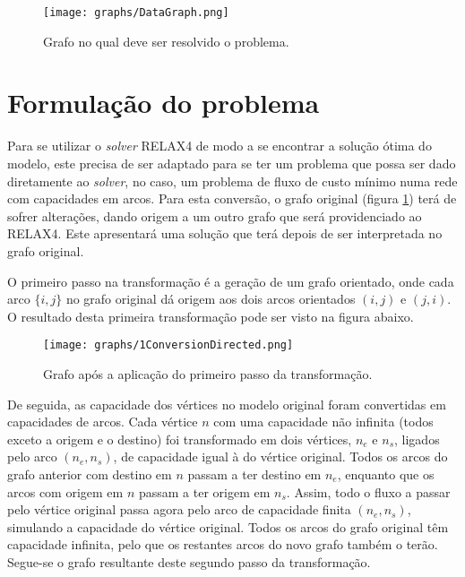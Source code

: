 \documentclass[12pt, a4paper, titlepage]{article}
\begin{document}
\begin{figure}[H]
    \centering
    \texttt{[image: graphs/DataGraph.png]}
    \caption{Grafo no qual deve ser resolvido o problema.}
    \label{data-graph}
\end{figure}

\pagebreak
\section{Formulação do problema}


Para se utilizar o \emph{solver} RELAX4 \cite{relax} de modo a se encontrar a solução ótima do
modelo, este precisa de ser adaptado para se ter um problema que possa ser dado diretamente ao
\emph{solver}, no caso, um problema de fluxo de custo mínimo numa rede com capacidades em arcos.
Para esta conversão, o grafo original (figura \ref{data-graph}) terá de sofrer alterações, dando
origem a um outro grafo que será providenciado ao RELAX4. Este apresentará uma solução que terá
depois de ser interpretada no grafo original.

O primeiro passo na transformação é a geração de um grafo orientado, onde cada arco $\{i, j\}$ no
grafo original dá origem aos dois arcos orientados $(i, j)$ e $(j, i)$. O resultado desta primeira
transformação pode ser visto na figura abaixo.

\begin{figure}[H]
    \centering
    \texttt{[image: graphs/1ConversionDirected.png]}
    \caption{Grafo após a aplicação do primeiro passo da transformação.}
    \label{1conversion-graph}
\end{figure}

De seguida, as capacidade dos vértices no modelo original foram convertidas em capacidades de arcos.
Cada vértice $n$ com uma capacidade não infinita (todos exceto a origem e o destino) foi
transformado em dois vértices, $n_e$ e $n_s$, ligados pelo arco $(n_e, n_s)$, de capacidade igual à
do vértice original. Todos os arcos do grafo anterior com destino em $n$ passam a ter destino em
$n_e$, enquanto que os arcos com origem em $n$ passam a ter origem em $n_s$. Assim, todo o fluxo a
passar pelo vértice original passa agora pelo arco de capacidade finita $(n_e, n_s)$, simulando a
capacidade do vértice original. Todos os arcos do grafo original têm capacidade infinita, pelo que
os restantes arcos do novo grafo também o terão. Segue-se o grafo resultante deste segundo passo da
transformação.
\end{document}
